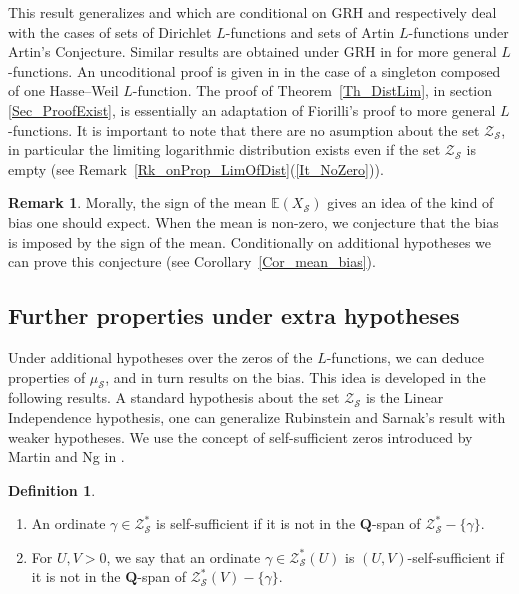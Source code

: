 \documentclass[a4paper,10pt]{amsart}
\theoremstyle{plain}
\theoremstyle{definition}
\newtheorem{defi}{Definition}
\newtheorem{Rk}{Remark}
\begin{document}
This result generalizes \cite[Th 1.1]{RS} and \cite[Th. 5.1.2]{NgThesis} which are conditional on GRH 
and respectively deal with the cases of sets of Dirichlet $L$-functions and sets of Artin $L$-functions under Artin's Conjecture. 
Similar results are obtained under GRH in \cite{ANS} for more general $L$-functions. 
An uncoditional proof is given in \cite{FioEC} in the case of a singleton composed of one Hasse--Weil $L$-function.
The proof of Theorem~\ref{Th_DistLim}, in section \ref{Sec_ProofExist}, is essentially an adaptation of Fiorilli's proof to more general $L$-functions.
It is important to note that there are no asumption about the set $\mathcal{Z}_{\mathcal{S}}$, 
in particular the limiting logarithmic distribution exists even if the set $\mathcal{Z}_{\mathcal{S}}$ is empty 
(see Remark~\ref{Rk_onProp_LimOfDist}(\ref{It_NoZero})).

\begin{Rk}\label{Rk_mean_bias}
Morally, the sign of the mean $\mathbb{E}(X_{\mathcal{S}})$ gives an idea of the kind of bias one should expect.
When the mean is non-zero, we conjecture that the bias is imposed by the sign of the mean.
Conditionally on additional hypotheses we can prove this conjecture 
(see Corollary~\ref{Cor_mean_bias}).
\end{Rk}

\subsection{Further properties under extra hypotheses}

Under additional hypotheses over the zeros of the $L$-functions, we can deduce properties of $\mu_{\mathcal{S}}$, and in turn results on the bias. 
This idea is developed in the following results.
A standard hypothesis about the set $\mathcal{Z}_{\mathcal{S}}$ is the Linear Independence hypothesis, 
one can generalize Rubinstein and Sarnak's result \cite[Rk. 1.3]{RS} with weaker hypotheses.
We use the concept of self-sufficient zeros introduced by Martin and Ng in \cite{MartinNg}.

\begin{defi}\label{Def_selfsuff}\begin{enumerate}
\item An ordinate $\gamma\in\mathcal{Z}_{\mathcal{S}}^{*}$ is self-sufficient if it is not in the $\mathbf{Q}$-span of $\mathcal{Z}_{\mathcal{S}}^{*}-\lbrace \gamma\rbrace$.
\item For $U,V>0$, we say that an ordinate $\gamma\in\mathcal{Z}_{\mathcal{S}}^{*}(U)$ is $(U,V)$-self-sufficient if it is not in the $\mathbf{Q}$-span of $\mathcal{Z}_{\mathcal{S}}^{*}(V)-\lbrace \gamma\rbrace$.
\end{enumerate}
\end{defi}
\end{document}
